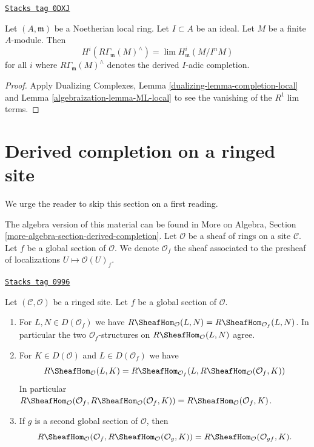 \begin{lemma}
\label{algebraization-lemma-local-cohomology-derived-completion}
\href{https://stacks.math.columbia.edu/tag/0DXJ}{\texttt{Stacks tag 0DXJ}}

Let $(A, \mathfrak m)$ be a Noetherian local ring.
Let $I \subset A$ be an ideal. Let $M$ be a finite $A$-module.
Then
$$
H^i(R\Gamma_\mathfrak m(M)^\wedge) = \lim H^i_\mathfrak m(M/I^nM)
$$
for all $i$ where $R\Gamma_\mathfrak m(M)^\wedge$ denotes
the derived $I$-adic completion.
\end{lemma}

\begin{proof}

Apply Dualizing Complexes, Lemma \ref{dualizing-lemma-completion-local}
and Lemma \ref{algebraization-lemma-ML-local} to see the vanishing of the $R^1\lim$ terms.
\end{proof}

\section{Derived completion on a ringed site}
\label{algebraization-section-derived-completion}
We urge the reader to skip this section on a first reading.

\medskip\noindent
The algebra version of this material can be found in
More on Algebra, Section \ref{more-algebra-section-derived-completion}.
Let $\mathcal{O}$ be a sheaf of rings on a site $\mathcal{C}$.
Let $f$ be a global section of $\mathcal{O}$. We denote
$\mathcal{O}_f$ the sheaf associated to the presheaf of localizations
$U \mapsto \mathcal{O}(U)_f$.

\begin{lemma}
\label{algebraization-lemma-map-twice-localize}
\href{https://stacks.math.columbia.edu/tag/0996}{\texttt{Stacks tag 0996}}

Let $(\mathcal{C}, \mathcal{O})$ be a ringed site. Let $f$ be a global
section of $\mathcal{O}$.
\begin{enumerate}
\item For $L, N \in D(\mathcal{O}_f)$ we have
$R\SheafHom_\mathcal{O}(L, N) = R\SheafHom_{\mathcal{O}_f}(L, N)$.
In particular the two $\mathcal{O}_f$-structures on
$R\SheafHom_\mathcal{O}(L, N)$ agree.
\item For $K \in D(\mathcal{O})$ and
$L \in D(\mathcal{O}_f)$ we have
$$
R\SheafHom_\mathcal{O}(L, K) =
R\SheafHom_{\mathcal{O}_f}(L, R\SheafHom_\mathcal{O}(\mathcal{O}_f, K))
$$
In particular
$R\SheafHom_\mathcal{O}(\mathcal{O}_f,
R\SheafHom_\mathcal{O}(\mathcal{O}_f, K)) =
R\SheafHom_\mathcal{O}(\mathcal{O}_f, K)$.
\item If $g$ is a second global
section of $\mathcal{O}$, then
$$
R\SheafHom_\mathcal{O}(\mathcal{O}_f, R\SheafHom_\mathcal{O}(\mathcal{O}_g, K))
= R\SheafHom_\mathcal{O}(\mathcal{O}_{gf}, K).
$$
\end{enumerate}
\end{lemma}

